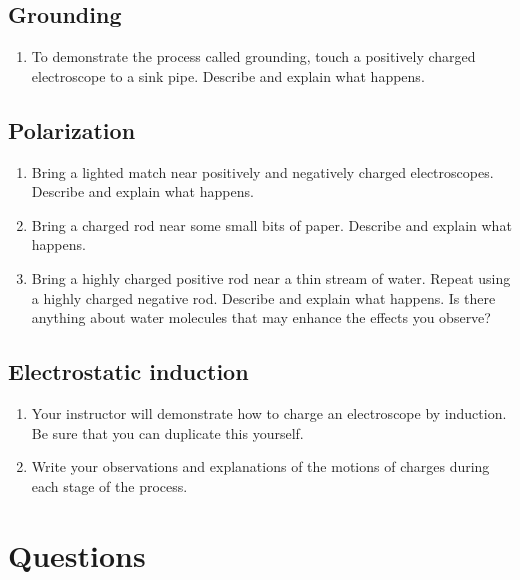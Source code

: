 \begin{multicols}{2}
\subsection{Grounding}
\begin{enumerate}[resume]
 \item To demonstrate the process called grounding, touch a positively charged electroscope to a sink pipe.  Describe and explain what happens.
\end{enumerate}

\subsection{Polarization}
\begin{enumerate}[resume]
	\item Bring a lighted match near positively and negatively charged electroscopes. Describe and explain what happens.
	\item Bring a charged rod near some small bits of paper.  Describe and explain what happens.
	\item Bring a highly charged positive rod near a thin stream of water.  Repeat using a highly charged negative rod.  Describe and explain what happens. Is there anything about water molecules that may enhance the effects you observe?
\end{enumerate}

\subsection{Electrostatic induction}
\begin{enumerate}[resume]
	 \item Your instructor will demonstrate how to charge an electroscope by induction.  Be sure that you can duplicate this yourself. 
	 \item Write your observations and explanations of the motions of charges during each stage of the process.
\end{enumerate}
\end{multicols}
\section{Questions}

